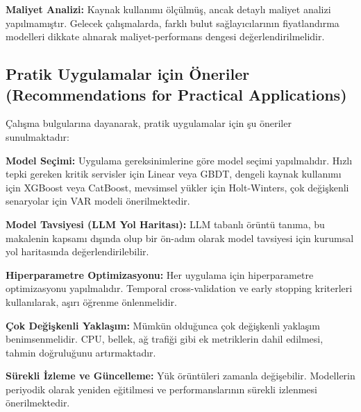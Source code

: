 \textbf{Maliyet Analizi:} Kaynak kullanımı ölçülmüş, ancak detaylı maliyet analizi yapılmamıştır. Gelecek çalışmalarda, farklı bulut sağlayıcılarının fiyatlandırma modelleri dikkate alınarak maliyet-performans dengesi değerlendirilmelidir.

\subsection{Pratik Uygulamalar için Öneriler (Recommendations for Practical Applications)}

Çalışma bulgularına dayanarak, pratik uygulamalar için şu öneriler sunulmaktadır:

\textbf{Model Seçimi:} Uygulama gereksinimlerine göre model seçimi yapılmalıdır. Hızlı tepki gereken kritik servisler için Linear veya GBDT, dengeli kaynak kullanımı için XGBoost veya CatBoost, mevsimsel yükler için Holt-Winters, çok değişkenli senaryolar için VAR modeli önerilmektedir.

\textbf{Model Tavsiyesi (LLM Yol Haritası):} LLM tabanlı örüntü tanıma, bu makalenin kapsamı dışında olup bir ön-adım olarak model tavsiyesi için kurumsal yol haritasında değerlendirilebilir.

\textbf{Hiperparametre Optimizasyonu:} Her uygulama için hiperparametre optimizasyonu yapılmalıdır. Temporal cross-validation ve early stopping kriterleri kullanılarak, aşırı öğrenme önlenmelidir.

\textbf{Çok Değişkenli Yaklaşım:} Mümkün olduğunca çok değişkenli yaklaşım benimsenmelidir. CPU, bellek, ağ trafiği gibi ek metriklerin dahil edilmesi, tahmin doğruluğunu artırmaktadır.

\textbf{Sürekli İzleme ve Güncelleme:} Yük örüntüleri zamanla değişebilir. Modellerin periyodik olarak yeniden eğitilmesi ve performanslarının sürekli izlenmesi önerilmektedir.

